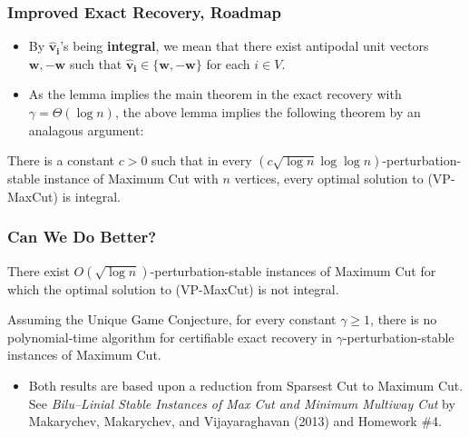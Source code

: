 \documentclass{beamer}
\begin{document}
    \begin{frame}
        \frametitle{Improved Exact Recovery, Roadmap}

        \begin{itemize}
            \item By $\mathbf{\hat v_i}$'s being {\bf integral}, we mean that there exist antipodal unit vectors $\mathbf w, -\mathbf w$ such that $\mathbf{\hat v_i} \in \{ \mathbf w, -\mathbf w \}$ for each $i \in V$. \pause
            \item As the lemma implies the main theorem in the exact recovery with $\gamma = \Theta(\log n)$, the above lemma implies the following theorem by an analagous argument:
        \end{itemize}

        \pause
    
        \begin{theorem}
            There is a constant $c > 0$ such that in every $(c \sqrt{\log n} \log \log n)$-perturbation-stable instance of {\sc Maximum Cut} with $n$ vertices, every optimal solution to {\sc (VP-MaxCut)} is integral.
        \end{theorem}
    \end{frame}

    \begin{frame}
        \frametitle{Can We Do Better?}

        \begin{theorem}
            There exist $O(\sqrt{\log n})$-perturbation-stable instances of {\sc Maximum Cut} for which the optimal solution to {\sc (VP-MaxCut)} is not integral.
        \end{theorem}

        \pause
    
        \begin{theorem}
            Assuming the Unique Game Conjecture, for every constant $\gamma \geq 1$, there is no polynomial-time algorithm for certifiable exact recovery in $\gamma$-perturbation-stable instances of {\sc Maximum Cut}.
        \end{theorem}

        \pause

        \begin{itemize}
            \item Both results are based upon a reduction from {\sc Sparsest Cut} to {\sc Maximum Cut}. See \emph{Bilu–Linial Stable Instances of Max Cut and Minimum Multiway Cut} by Makarychev, Makarychev, and Vijayaraghavan (2013) and Homework \#4.
        \end{itemize}
    \end{frame}
\end{document}
